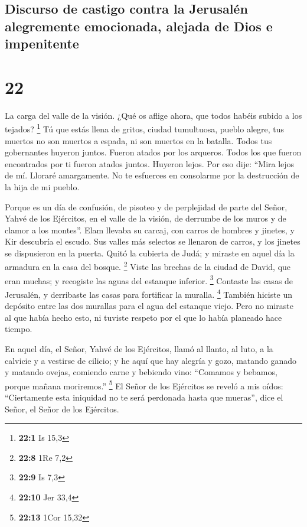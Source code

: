 \hypertarget{discurso-de-castigo-contra-la-jerusaluxe9n-alegremente-emocionada-alejada-de-dios-e-impenitente}{%
\subsection{Discurso de castigo contra la Jerusalén alegremente
emocionada, alejada de Dios e
impenitente}\label{discurso-de-castigo-contra-la-jerusaluxe9n-alegremente-emocionada-alejada-de-dios-e-impenitente}}

\hypertarget{section-21}{%
\section{22}\label{section-21}}

 La carga del valle de la visión. ¿Qué os aflige ahora,
que todos habéis subido a los tejados? \footnote{\textbf{22:1} Is 15,3}
 Tú que estás llena de gritos, ciudad tumultuosa, pueblo
alegre, tus muertos no son muertos a espada, ni son muertos en la
batalla.  Todos tus gobernantes huyeron juntos. Fueron
atados por los arqueros. Todos los que fueron encontrados por ti fueron
atados juntos. Huyeron lejos.  Por eso dije: ``Mira lejos
de mí. Lloraré amargamente. No te esfuerces en consolarme por la
destrucción de la hija de mi pueblo.

 Porque es un día de confusión, de pisoteo y de
perplejidad de parte del Señor, Yahvé de los Ejércitos, en el valle de
la visión, de derrumbe de los muros y de clamor a los montes''.
 Elam llevaba su carcaj, con carros de hombres y jinetes,
y Kir descubría el escudo.  Sus valles más selectos se
llenaron de carros, y los jinetes se dispusieron en la puerta.
 Quitó la cubierta de Judá; y miraste en aquel día la
armadura en la casa del bosque. \footnote{\textbf{22:8} 1Re 7,2}
 Viste las brechas de la ciudad de David, que eran muchas;
y recogiste las aguas del estanque inferior. \footnote{\textbf{22:9} Is
  7,3}  Contaste las casas de Jerusalén, y derribaste las
casas para fortificar la muralla. \footnote{\textbf{22:10} Jer 33,4}
 También hiciste un depósito entre las dos murallas para
el agua del estanque viejo. Pero no miraste al que había hecho esto, ni
tuviste respeto por el que lo había planeado hace tiempo.

 En aquel día, el Señor, Yahvé de los Ejércitos, llamó al
llanto, al luto, a la calvicie y a vestirse de cilicio; 
y he aquí que hay alegría y gozo, matando ganado y matando ovejas,
comiendo carne y bebiendo vino: ``Comamos y bebamos, porque mañana
moriremos.'' \footnote{\textbf{22:13} 1Cor 15,32}  El
Señor de los Ejércitos se reveló a mis oídos: ``Ciertamente esta
iniquidad no te será perdonada hasta que mueras'', dice el Señor, el
Señor de los Ejércitos.

